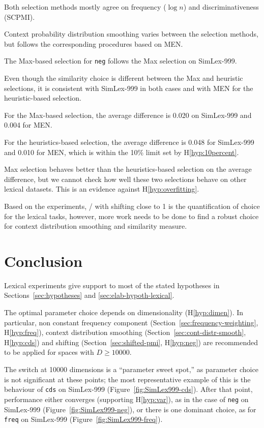 Both selection methods mostly agree on frequency ($\log n$) and discriminativeness (SCPMI).

Context probability distribution smoothing varies between the selection methods, but follows the corresponding procedures based on MEN.

The Max-based selection for \texttt{neg} follows the Max selection on SimLex-999.

Even though the similarity choice is different between the Max and heuristic selections, it is consistent with SimLex-999 in both cases and with MEN for the heuristic-based selection.

For the Max-based selection, the average difference is 0.020 on SimLex-999 and 0.004 for MEN.

For the heuristics-based selection, the average difference is 0.048 for SimLex-999 and 0.010 for MEN, which is within the 10\% limit set by H\ref{hyp:10percent}.

Max selection behaves better than the heuristics-based selection on the average difference, but we cannot check how well these two selections behave on other lexical datasets. This is an evidence against H\ref{hyp:overfitting}.

Based on the experiments, \logNSCPMI/ with shifting close to 1 is the quantification of choice for the lexical tasks, however, more work needs to be done to find a robust choice for context distribution smoothing and similarity measure.

\section{Conclusion}
\label{sec:conclusion-lexical}

Lexical experiments give support to most of the stated hypotheses in Sections~\ref{sec:hypotheses} and \ref{sec:elab-hypoth-lexical}.

The optimal parameter choice depends on dimensionality (H\ref{hyp:dimen}). In particular, non constant frequency component (Section~\ref{sec:frequency-weighting}, H\ref{hyp:freq}), context distribution smoothing (Section~\ref{sec:cont-distr-smooth}, H\ref{hyp:cds}) and shifting (Section~\ref{sec:shifted-pmi}, H\ref{hyp:neg}) are recommended to be applied for spaces with $D \geq 10000$.

The switch at 10000 dimensions is a ``parameter sweet spot,'' as parameter choice is not significant at these points; the most representative example of this is the behaviour of \texttt{cds} on SimLex-999 (Figure~\ref{fig:SimLex999-cds}). After that point, performance either converges (supporting H\ref{hyp:var}), as in the case of \texttt{neg} on SimLex-999 (Figure~\ref{fig:SimLex999-neg}), or there is one dominant choice, as for \texttt{freq} on SimLex-999 (Figure~\ref{fig:SimLex999-freq}).

